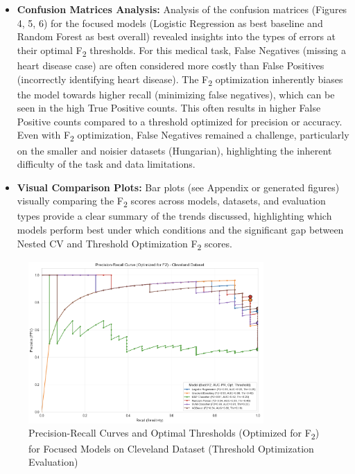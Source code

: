 \documentclass{article}
\begin{document}
\begin{itemize}
    \item \textbf{Confusion Matrices Analysis:} Analysis of the confusion matrices (Figures 4, 5, 6) for the focused models (Logistic Regression as best baseline and Random Forest as best overall) revealed insights into the types of errors at their optimal F\textsubscript{2} thresholds. For this medical task, False Negatives (missing a heart disease case) are often considered more costly than False Positives (incorrectly identifying heart disease). The F\textsubscript{2} optimization inherently biases the model towards higher recall (minimizing false negatives), which can be seen in the high True Positive counts. This often results in higher False Positive counts compared to a threshold optimized for precision or accuracy. Even with F\textsubscript{2} optimization, False Negatives remained a challenge, particularly on the smaller and noisier datasets (Hungarian), highlighting the inherent difficulty of the task and data limitations.
    \item \textbf{Visual Comparison Plots:} Bar plots (see Appendix or generated figures) visually comparing the F\textsubscript{2} scores across models, datasets, and evaluation types provide a clear summary of the trends discussed, highlighting which models perform best under which conditions and the significant gap between Nested CV and Threshold Optimization F\textsubscript{2} scores.
\end{itemize}

\begin{figure}[htbp]
    \centering
    \includegraphics[width=0.8\textwidth]{plots/Cleveland_PR_Curve.png} %
    \caption{Precision-Recall Curves and Optimal Thresholds (Optimized for F\textsubscript{2}) for Focused Models on Cleveland Dataset (Threshold Optimization Evaluation)}
    \label{fig:pr_curve_cleveland}
\end{figure}
\end{document}
